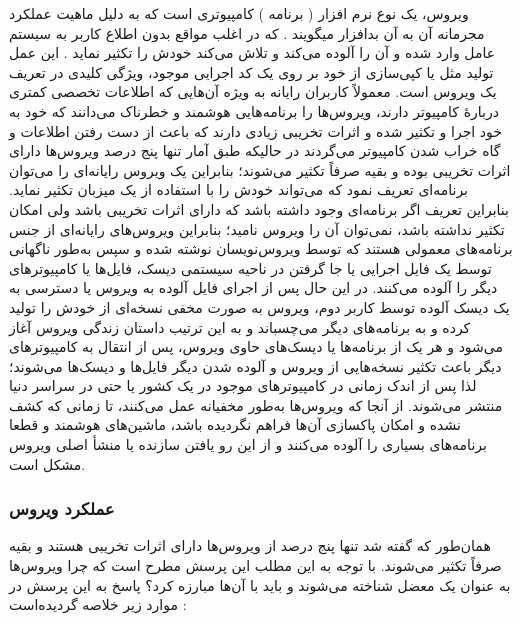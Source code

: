 \documentclass[12pt]{book}
\begin{document}
ویروس، یک نوع نرم افزار ( برنامه ) کامپیوتری است که به دلیل ماهیت عملکرد مجرمانه آن به آن بدافزار میگویند . که در اغلب مواقع بدون اطلاع کاربر به سیستم عامل وارد شده و آن را آلوده می‌کند و تلاش می‌کند خودش را تکثیر نماید . این عمل تولید مثل یا کپی‌سازی از خود بر روی یک کد اجرایی موجود، ویژگی کلیدی در تعریف یک ویروس است. معمولاً کاربران رایانه به ویژه آن‌هایی که اطلاعات تخصصی کمتری دربارهٔ کامپیوتر دارند، ویروس‌ها را برنامه‌هایی هوشمند و خطرناک می‌دانند که خود به خود اجرا و تکثیر شده و اثرات تخریبی زیادی دارند که باعث از دست رفتن اطلاعات و گاه خراب شدن کامپیوتر می‌گردند در حالیکه طبق آمار تنها پنج درصد ویروس‌ها دارای اثرات تخریبی بوده و بقیه صرفاً تکثیر می‌شوند؛ بنابراین یک ویروس رایانه‌ای را می‌توان برنامه‌ای تعریف نمود که می‌تواند خودش را با استفاده از یک میزبان تکثیر نماید. بنابراین تعریف اگر برنامه‌ای وجود داشته باشد که دارای اثرات تخریبی باشد ولی امکان تکثیر نداشته باشد، نمی‌توان آن را ویروس نامید؛ بنابراین ویروس‌های رایانه‌ای از جنس برنامه‌های معمولی هستند که توسط ویروس‌نویسان نوشته شده و سپس به‌طور ناگهانی توسط یک فایل اجرایی یا جا گرفتن در ناحیه سیستمی دیسک، فایل‌ها یا کامپیوترهای دیگر را آلوده می‌کنند. در این حال پس از اجرای فایل آلوده به ویروس یا دسترسی به یک دیسک آلوده توسط کاربر دوم، ویروس به صورت مخفی نسخه‌ای از خودش را تولید کرده و به برنامه‌های دیگر می‌چسباند و به این ترتیب داستان زندگی ویروس آغاز می‌شود و هر یک از برنامه‌ها یا دیسک‌های حاوی ویروس، پس از انتقال به کامپیوترهای دیگر باعث تکثیر نسخه‌هایی از ویروس و آلوده شدن دیگر فایل‌ها و دیسک‌ها می‌شوند؛ لذا پس از اندک زمانی در کامپیوترهای موجود در یک کشور یا حتی در سراسر دنیا منتشر می‌شوند. از آنجا که ویروس‌ها به‌طور مخفیانه عمل می‌کنند، تا زمانی که کشف نشده و امکان پاکسازی آن‌ها فراهم نگردیده باشد، ماشین‌های هوشمند و قطعا برنامه‌های بسیاری را آلوده می‌کنند و از این رو یافتن سازنده یا منشأ اصلی ویروس مشکل است. 


\subsubsection{عملکرد ویروس}

همان‌طور که گفته شد تنها پنج درصد از ویروس‌ها دارای اثرات تخریبی هستند و بقیه صرفاً تکثیر می‌شوند. با توجه به این مطلب این پرسش مطرح است که چرا ویروس‌ها به عنوان یک معضل شناخته می‌شوند و باید با آن‌ها مبارزه کرد؟ پاسخ به این پرسش در موارد زیر خلاصه گردیده‌است : 
\end{document}
